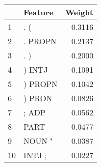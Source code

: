 \begin{tabular}{llr}
\toprule
{} &  Feature &  Weight \\
\midrule
1  &      . ( &  0.3116 \\
2  &  . PROPN &  0.2137 \\
3  &      . ) &  0.2000 \\
4  &   ) INTJ &  0.1091 \\
5  &  ) PROPN &  0.1042 \\
6  &   ) PRON &  0.0826 \\
7  &    ; ADP &  0.0562 \\
8  &   PART - &  0.0477 \\
9  &   NOUN " &  0.0387 \\
10 &   INTJ ; &  0.0227 \\
\bottomrule
\end{tabular}
